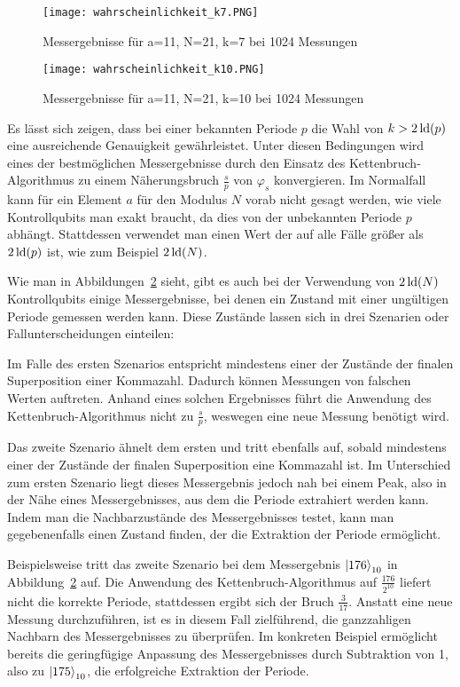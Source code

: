 \begin{figure}[H]
    \centering
    \texttt{[image: wahrscheinlichkeit\_k7.PNG]}
    \caption{Messergebnisse für a=11, N=21, k=7 bei 1024 Messungen}
    \label{fig:Messung7k}
\end{figure}
\begin{figure}[H]
    \centering
    \texttt{[image: wahrscheinlichkeit\_k10.PNG]}
    \caption{Messergebnisse für a=11, N=21, k=10 bei 1024 Messungen}
    \label{fig:Messung10k}
\end{figure}

Es lässt sich zeigen, dass bei einer bekannten Periode \(p\) die Wahl von \(k > 2\operatorname{ld}(p)\) 
eine ausreichende Genauigkeit gewährleistet. 
Unter diesen Bedingungen wird eines der bestmöglichen Messergebnisse durch den Einsatz des Kettenbruch-Algorithmus zu einem Näherungsbruch \(\frac{s}{p}\) von \(\varphi_s\) konvergieren.
Im Normalfall kann für ein Element \(a\) für den Modulus \(N\) vorab nicht gesagt werden, 
wie viele Kontrollqubits man exakt braucht, 
da dies von der unbekannten Periode \(p\) abhängt.
Stattdessen verwendet man einen Wert der auf alle Fälle größer als \(2\operatorname{ld}(p)\) ist, 
wie zum Beispiel \(2\operatorname{ld}(N)\).~\cite{Shor_1997,mosca1999hidden}

Wie man in Abbildungen~\ref{fig:Messung10k} sieht, 
gibt es auch bei der Verwendung von \(2\operatorname{ld}(N)\) Kontrollqubits einige Messergebnisse, 
bei denen ein Zustand mit einer ungültigen Periode gemessen werden kann.
Diese Zustände lassen sich in drei Szenarien oder Fallunterscheidungen einteilen:

Im Falle des ersten Szenarios 
entspricht mindestens einer der Zustände der finalen Superposition einer Kommazahl.
Dadurch können Messungen von falschen Werten auftreten.
Anhand eines solchen Ergebnisses führt die Anwendung des Kettenbruch-Algorithmus nicht zu \(\frac{s}{p}\), 
weswegen eine neue Messung benötigt wird.

Das zweite Szenario ähnelt dem ersten und tritt ebenfalls auf, 
sobald mindestens einer der Zustände der finalen Superposition eine Kommazahl ist. 
Im Unterschied zum ersten Szenario liegt dieses Messergebnis jedoch nah bei einem Peak, 
also in der Nähe eines Messergebnisses, aus dem die Periode extrahiert werden kann. 
Indem man die Nachbarzustände des Messergebnisses testet, kann man gegebenenfalls einen Zustand finden, 
der die Extraktion der Periode ermöglicht.

Beispielsweise tritt das zweite Szenario bei dem Messergebnis \(\ket{176}_{10}\) in Abbildung~\ref{fig:Messung10k} auf.
Die Anwendung des Kettenbruch-Algorithmus auf \(\frac{176}{2^{10}}\) 
liefert nicht die korrekte Periode, stattdessen ergibt sich der Bruch \(\frac{3}{17}\). 
Anstatt eine neue Messung durchzuführen,
ist es in diesem Fall zielführend, 
die ganzzahligen Nachbarn des Messergebnisses zu überprüfen.
Im konkreten Beispiel ermöglicht bereits die geringfügige Anpassung des Messergebnisses durch Subtraktion von 1, 
also zu \(\ket{175}_{10}\), 
die erfolgreiche Extraktion der Periode.

